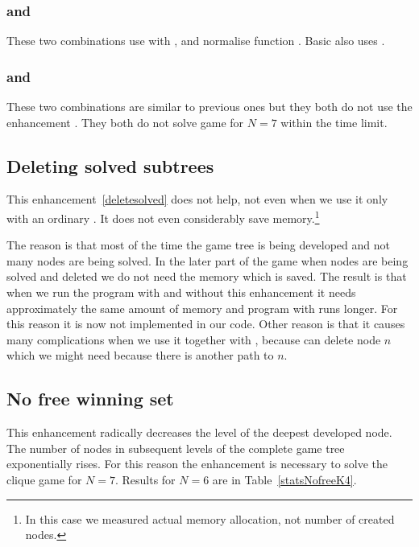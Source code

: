 \subsubsection{ and } 

These two combinations use  with ,
 and normalise function . Basic also uses .

\subsubsection{ and }

These two combinations are similar to previous ones but they both do not use the enhancement
. They both do not solve game for $N=7$ within the time limit.

\subsection{Deleting solved subtrees} \label{deletesolved2} 

This enhancement~\ref{deletesolved} does not help, not even when we use it only
with an ordinary . It does not even considerably save
memory.\footnote{In this case we measured actual memory allocation, not number
of created nodes.}

The reason is that most of the time the game tree is being developed and not many
nodes are being solved. In the later part of the game when nodes are being
solved and deleted we do not need the memory which is saved. The result is that
when we run the program with and without this enhancement it needs approximately
the same amount of memory and program with  runs
longer. For this reason it is now not implemented in our code. Other
reason is that it causes many complications when we use it together with
, because 
can delete node $n$ which we might need because there is another path to $n$. 

\subsection{No free winning set}

This enhancement radically decreases the level of the deepest developed node.
The number of nodes in subsequent levels of the complete game tree exponentially 
rises. For this reason the enhancement  is
necessary to solve the  clique game for $N=7$. Results for $N=6$ are in
Table~\ref{statsNofreeK4}.


